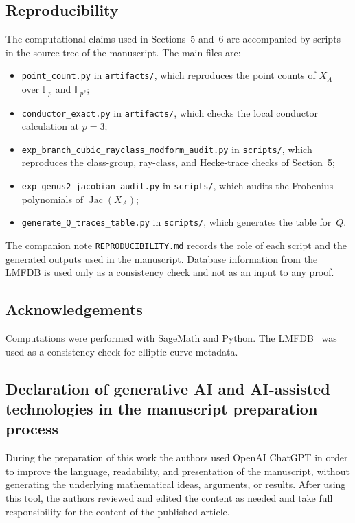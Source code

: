 \documentclass[11pt,letterpaper]{article}
\theoremstyle{plain}
\theoremstyle{remark}
\newcommand{\Jac}{\operatorname{Jac}}
\newcommand{\F}{\mathbb{F}}
\begin{document}
\subsection*{Reproducibility}
The computational claims used in Sections~5 and~6 are accompanied by scripts in the source tree of the manuscript. The main files are:
\begin{itemize}
\item \texttt{point\_count.py} in \texttt{artifacts/}, which reproduces the point counts of \(X_A\) over \(\F_p\) and \(\F_{p^2}\);
\item \texttt{conductor\_exact.py} in \texttt{artifacts/}, which checks the local conductor calculation at \(p=3\);
\item \texttt{exp\_branch\_cubic\_rayclass\_modform\_audit.py} in \texttt{scripts/}, which reproduces the class-group, ray-class, and Hecke-trace checks of Section~5;
\item \texttt{exp\_genus2\_jacobian\_audit.py} in \texttt{scripts/}, which audits the Frobenius polynomials of \(\Jac(X_A)\);
\item \texttt{generate\_Q\_traces\_table.py} in \texttt{scripts/}, which generates the table for~\(Q\).
\end{itemize}
The companion note \texttt{REPRODUCIBILITY.md} records the role of each script and the generated outputs used in the manuscript. Database information from the LMFDB is used only as a consistency check and not as an input to any proof.

\subsection*{Acknowledgements}
Computations were performed with SageMath and Python. The LMFDB~\cite{LMFDB} was used as a consistency check for elliptic-curve metadata.

\subsection*{Declaration of generative AI and AI-assisted technologies in the manuscript preparation process}
During the preparation of this work the authors used OpenAI ChatGPT in order to improve the language, readability, and presentation of the manuscript, without generating the underlying mathematical ideas, arguments, or results. After using this tool, the authors reviewed and edited the content as needed and take full responsibility for the content of the published article.



\end{document}

